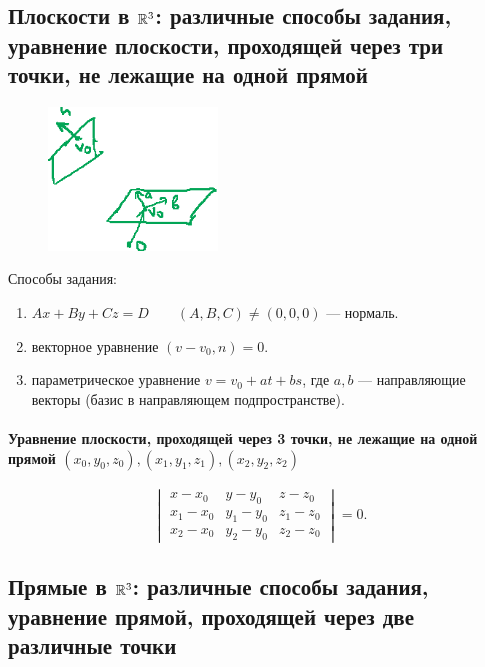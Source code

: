 \subsection{Плоскости в $\mathbb{R}^3$: различные способы задания, уравнение плоскости, проходящей через три точки, не лежащие на одной прямой}

\begin{figure}
    \includegraphics[width=4.5cm]{lecture26_drawing_2}
    \vspace{-30pt}
\end{figure}

Способы задания:

\begin{enumerate}
    \item $Ax + By + Cz = D \quad\quad(A, B, C) \neq (0, 0, 0)$ --- нормаль.
    \item векторное уравнение $(v - v_0, n) = 0$.
    \item параметрическое уравнение $v = v_0 + at + bs$, где $a, b$ --- направляющие векторы (базис в направляющем подпространстве).
\end{enumerate}

\paragraph{Уравнение плоскости, проходящей через 3 точки, не лежащие на одной прямой $(x_0, y_0, z_0), (x_1, y_1, z_1), (x_2, y_2, z_2)$}

\begin{equation*}
    \begin{vmatrix} 
        x - x_0 & y - y_0 & z - z_0 \\
        x_1 - x_0 & y_1 - y_0 & z_1 - z_0 \\
        x_2 - x_0 & y_2 - y_0 & z_2 - z_0
    \end{vmatrix} = 0
.\end{equation*}


\subsection{Прямые в $\mathbb{R}^3$: различные способы задания, уравнение прямой, проходящей через две различные точки}

